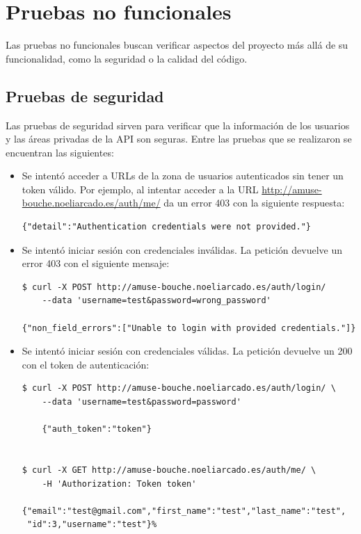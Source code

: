 \section{Pruebas no funcionales}

Las pruebas no funcionales buscan verificar aspectos del proyecto más allá de su
funcionalidad, como la seguridad o la calidad del código.

\subsection{Pruebas de seguridad}

Las pruebas de seguridad sirven para verificar que la información de los
usuarios y las áreas privadas de la API son seguras. Entre las pruebas que se
realizaron se encuentran las siguientes:
\begin{itemize}
\item Se intentó acceder a URLs de la zona de usuarios autenticados sin tener
  un token válido. Por ejemplo, al intentar acceder a la URL
  \url{http://amuse-bouche.noeliarcado.es/auth/me/} da un error 403 con la
  siguiente respuesta:
  \begin{verbatim}
{"detail":"Authentication credentials were not provided."}
  \end{verbatim}

\item Se intentó iniciar sesión con credenciales inválidas. La petición devuelve
  un error 403 con el siguiente mensaje:
  \begin{verbatim}
$ curl -X POST http://amuse-bouche.noeliarcado.es/auth/login/
    --data 'username=test&password=wrong_password'

{"non_field_errors":["Unable to login with provided credentials."]}
  \end{verbatim}

\item Se intentó iniciar sesión con credenciales válidas. La petición devuelve un
  200 con el token de autenticación:

  \begin{verbatim}
$ curl -X POST http://amuse-bouche.noeliarcado.es/auth/login/ \
    --data 'username=test&password=password'

    {"auth_token":"token"}

    
$ curl -X GET http://amuse-bouche.noeliarcado.es/auth/me/ \
    -H 'Authorization: Token token'
    
{"email":"test@gmail.com","first_name":"test","last_name":"test",
 "id":3,"username":"test"}%  
  \end{verbatim}


\end{itemize}
